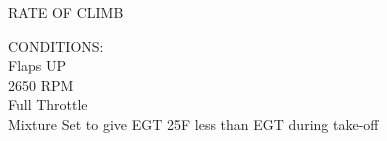 \begin{figure}[t]
\begin{center}
\begin{perfhdr}RATE OF CLIMB
\end{perfhdr}
\vspace{5ex}
\begin{minipage}{4in}
  \begin{flushleft}
    CONDITIONS:\\
    Flaps UP\\
    2650 RPM\\
    Full Throttle\\
    Mixture Set to give EGT 25\textdegree F less than EGT during take-off\\
    \end{flushleft}
  \end{minipage}
\hfill
\\
\vspace{\perfnoteskip}

\settowidth{\colOne}{WEIGHT}
\settowidth{\colTwo}{PRESSURE}
\settowidth{\colThree}{CLIMB}
\settowidth{\colFour}{-20\textdegree C}
\settowidth{\colFive}{9,999}
\settowidth{\colSix}{9,999}
\settowidth{\colSeven}{9,999}


\end{center}
\end{figure}
